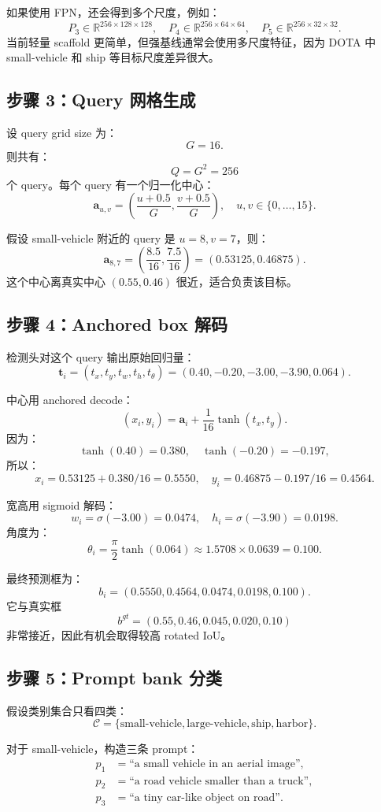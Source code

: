 \documentclass[11pt,a4paper]{ctexart}
\begin{document}
如果使用 FPN，还会得到多个尺度，例如：
\[
P_3\in\mathbb{R}^{256\times128\times128},\quad
P_4\in\mathbb{R}^{256\times64\times64},\quad
P_5\in\mathbb{R}^{256\times32\times32}.
\]
当前轻量 scaffold 更简单，但强基线通常会使用多尺度特征，因为 DOTA 中 small-vehicle 和 ship 等目标尺度差异很大。

\subsection{步骤 3：Query 网格生成}

设 query grid size 为：
\[
G=16.
\]
则共有：
\[
Q=G^2=256
\]
个 query。每个 query 有一个归一化中心：
\[
\bm a_{u,v}=\left(\frac{u+0.5}{G},\frac{v+0.5}{G}\right),
\quad u,v\in\{0,\ldots,15\}.
\]

假设 small-vehicle 附近的 query 是 $u=8,v=7$，则：
\[
\bm a_{8,7}=\left(\frac{8.5}{16},\frac{7.5}{16}\right)
=(0.53125,0.46875).
\]
这个中心离真实中心 $(0.55,0.46)$ 很近，适合负责该目标。

\subsection{步骤 4：Anchored box 解码}

检测头对这个 query 输出原始回归量：
\[
\bm t_i=(t_x,t_y,t_w,t_h,t_\theta)
=(0.40,-0.20,-3.00,-3.90,0.064).
\]

中心用 anchored decode：
\[
(x_i,y_i)=\bm a_i+\frac{1}{16}\tanh(t_x,t_y).
\]
因为：
\[
\tanh(0.40)=0.380,\quad \tanh(-0.20)=-0.197,
\]
所以：
\[
x_i=0.53125+0.380/16=0.5550,
\quad
y_i=0.46875-0.197/16=0.4564.
\]

宽高用 sigmoid 解码：
\[
w_i=\sigma(-3.00)=0.0474,\quad h_i=\sigma(-3.90)=0.0198.
\]
角度为：
\[
\theta_i=\frac{\pi}{2}\tanh(0.064)\approx1.5708\times0.0639=0.100.
\]

最终预测框为：
\[
b_i=(0.5550,0.4564,0.0474,0.0198,0.100).
\]
它与真实框
\[
b^{gt}=(0.55,0.46,0.045,0.020,0.10)
\]
非常接近，因此有机会取得较高 rotated IoU。

\subsection{步骤 5：Prompt bank 分类}

假设类别集合只看四类：
\[
\mathcal{C}=\{\text{small-vehicle},\text{large-vehicle},\text{ship},\text{harbor}\}.
\]

对于 small-vehicle，构造三条 prompt：
\[
\begin{aligned}
p_1&=\text{``a small vehicle in an aerial image''},\\
p_2&=\text{``a road vehicle smaller than a truck''},\\
p_3&=\text{``a tiny car-like object on road''}.
\end{aligned}
\]
\end{document}
